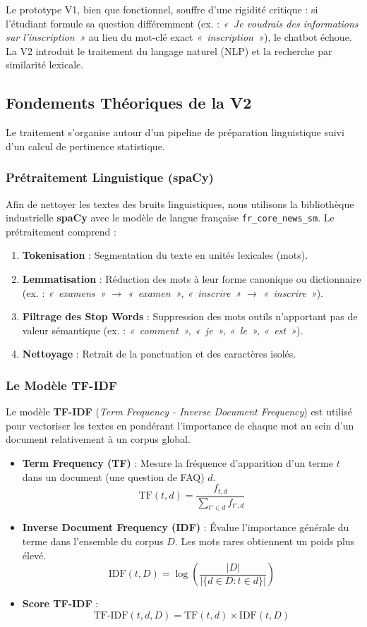 \documentclass[11pt,a4paper]{article}
\begin{document}
Le prototype V1, bien que fonctionnel, souffre d'une rigidité critique : si l'étudiant formule sa question différemment (ex. : \textit{«~Je voudrais des informations sur l'inscription~»} au lieu du mot-clé exact \textit{«~inscription~»}), le chatbot échoue. La V2 introduit le traitement du langage naturel (NLP) et la recherche par similarité lexicale.

\subsection{Fondements Théoriques de la V2}

Le traitement s'organise autour d'un pipeline de préparation linguistique suivi d'un calcul de pertinence statistique.

\subsubsection{Prétraitement Linguistique (spaCy)}
Afin de nettoyer les textes des bruits linguistiques, nous utilisons la bibliothèque industrielle \textbf{spaCy} avec le modèle de langue française \texttt{fr\_core\_news\_sm}. Le prétraitement comprend :
\begin{enumerate}
    \item \textbf{Tokenisation} : Segmentation du texte en unités lexicales (mots).
    \item \textbf{Lemmatisation} : Réduction des mots à leur forme canonique ou dictionnaire (ex. : \textit{«~examens~»} $\rightarrow$ \textit{«~examen~»}, \textit{«~inscrire~»} $\rightarrow$ \textit{«~inscrire~»}).
    \item \textbf{Filtrage des Stop Words} : Suppression des mots outils n'apportant pas de valeur sémantique (ex. : \textit{«~comment~», «~je~», «~le~», «~est~»}).
    \item \textbf{Nettoyage} : Retrait de la ponctuation et des caractères isolés.
\end{enumerate}

\subsubsection{Le Modèle TF-IDF}
Le modèle \textbf{TF-IDF} (\textit{Term Frequency - Inverse Document Frequency}) est utilisé pour vectoriser les textes en pondérant l'importance de chaque mot au sein d'un document relativement à un corpus global.
\begin{itemize}
    \item \textbf{Term Frequency (TF)} : Mesure la fréquence d'apparition d'un terme $t$ dans un document (une question de FAQ) $d$.
    \[ \text{TF}(t, d) = \frac{f_{t,d}}{\sum_{t' \in d} f_{t',d}} \]
    \item \textbf{Inverse Document Frequency (IDF)} : Évalue l'importance générale du terme dans l'ensemble du corpus $D$. Les mots rares obtiennent un poids plus élevé.
    \[ \text{IDF}(t, D) = \log\left(\frac{|D|}{|\{d \in D : t \in d\}|}\right) \]
    \item \textbf{Score TF-IDF} :
    \[ \text{TF-IDF}(t, d, D) = \text{TF}(t, d) \times \text{IDF}(t, D) \]
\end{itemize}
\end{document}
